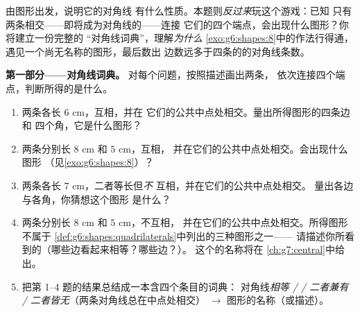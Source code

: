 \begin{problem}
\label{pb:g6:shapes:1}
由图形出发，说明它的对角线
有什么性质。本题则\emph{反过来}玩这个游戏：已知
只有两条相交——即将成为对角线的——连接
它们的四个端点，会出现什么图形？你将建立一份完整的
“对角线词典”，理解\emph{为什么}
\cref{exo:g6:shapes:8}中的作法行得通，
遇见一个尚无名称的图形，最后数出
边数远多于四条的的对角线条数。

\medskip
\noindent\textbf{第一部分——对角线词典。}
对每个问题，按照描述画出两条，
依次连接四个端点，判断所得的是什么。
\begin{enumerate}
  \item 两条各长 $6$ cm，互相，并在
        它们的公共中点处相交。量出所得图形的四条边和
        四个角，它是什么图形？
  \item 两条分别长 $8$ cm 和 $5$ cm，互相，
        并在它们的公共中点处相交。会出现什么图形
        （见\cref{exo:g6:shapes:8}）？
  \item 两条各长 $7$ cm，二者等长但\emph{不}
        互相，并在它们的公共中点处相交。
        量出各边与各角，你猜想这个图形
        是什么？
  \item 两条分别长 $8$ cm 和 $5$ cm，不互相，
        并在它们的公共中点处相交。所得图形不属于
        \cref{def:g6:shapes:quadrilaterals}中列出的三种图形之一——
        请描述你所看到的（哪些边看起来相等？哪些边？）。
        这个的名称将在
        \cref{ch:g7:central}中给出。
  \item 把第 1--4 题的结果总结成一本含四个条目的词典：
        对角线\emph{相等 /  / 二者兼有 /
        二者皆无}（两条对角线总在中点处相交）
        $\rightarrow$ 图形的名称（或描述）。
\end{enumerate}


\end{problem}
